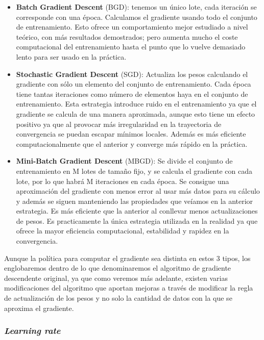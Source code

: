 \begin{itemize}
    \item \textbf{Batch Gradient Descent} (BGD): tenemos un único lote, cada iteración se corresponde con una época. Calculamos el gradiente usando todo el conjunto de entrenamiento. Esto ofrece un comportamiento mejor estudiado a nivel teórico, con más resultados demostrados; pero aumenta mucho el coste computacional del entrenamiento hasta el punto que lo vuelve demasiado lento para ser usado en la práctica.

    \item \textbf{Stochastic Gradient Descent} (SGD): Actualiza los pesos calculando el gradiente con sólo un elemento del conjunto de entrenamiento. Cada época tiene tantas iteraciones como número de elementos haya en el conjunto de entrenamiento. Esta estrategia introduce ruido en el entrenamiento ya que el gradiente se calcula de una manera aproximada, aunque esto tiene un efecto positivo ya que al provocar más irregularidad en la trayectoria de convergencia se puedan escapar mínimos locales. Además es más eficiente computacionalmente que el anterior y converge más rápido en la práctica.

    \item \textbf{Mini-Batch Gradient Descent} (MBGD): Se divide el conjunto de entrenamiento en M lotes de tamaño fijo, y se calcula el gradiente con cada lote, por lo que habrá M iteraciones en cada época. Se consigue una aproximación del gradiente con menos error al usar más datos para su cálculo y además se siguen manteniendo las propiedades que veíamos en la anterior estrategia. Es más eficiente que la anterior al conllevar menos actualizaciones de pesos. Es practicamente la única estrategia utilizada en la realidad ya que ofrece la mayor eficiencia computacional, estabilidad y rapidez en la convergencia.
\end{itemize}

Aunque la política para computar el gradiente sea distinta en estos 3 tipos, los englobaremos dentro de lo que denominaremos el algoritmo de gradiente descendente original, ya que como veremos más adelante, existen varias modificaciones del algoritmo que aportan mejoras a través de modificar la regla de actualización de los pesos y no solo la cantidad de datos con la que se aproxima el gradiente.

\subsubsection{\textit{Learning rate}}

